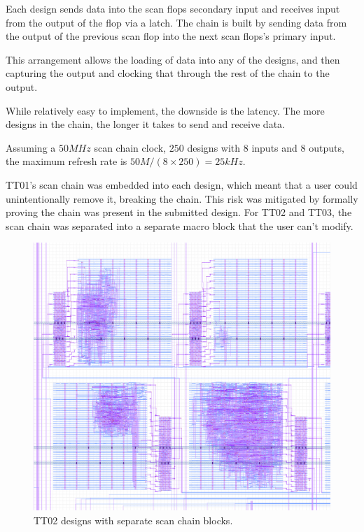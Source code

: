 Each design sends data into the scan flops secondary input and receives input from the output of the flop via a latch.
The chain is built\cite{updateiodesign} by sending data from the output of the previous scan flop into the next scan flops’s primary input.

This arrangement allows the loading of data into any of the designs, and then capturing the output and clocking that through the rest of the chain to the output.

While relatively easy to implement, the downside is the latency.
The more designs in the chain, the longer it takes to send and receive data.

Assuming a \(50 MHz\) scan chain clock, \(250\) designs with \(8\) inputs and \(8\) outputs, the maximum refresh rate is \(50M / (8 \times 250) = 25kHz\).

TT01’s scan chain was embedded into each design, which meant that a user could unintentionally remove it, breaking the chain.
This risk was mitigated by formally\cite{tinytapeoutscan} proving the chain was present in the submitted design.
For TT02 and TT03, the scan chain was separated into a separate macro block that the user can’t modify.

\begin{figure}[htp]
\centering
\includegraphics[width=\columnwidth]{./Figs/tt02_gds_zoom.png}
\caption{TT02 designs with separate scan chain blocks.}
\label{fig:TT02_separate_scan_blocks}
\end{figure}


